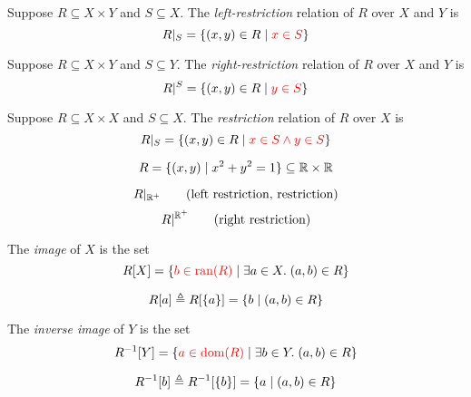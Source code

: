 \begin{frame}{}
  \begin{definition}
    Suppose $R \subseteq X \times Y$ and $S \subseteq X$.
    The {\it left-restriction} relation of $R$  over $X$ and $Y$ is
    \[
      R|_{S} = \{(x, y) \in R \mid \textcolor{red}{x \in S}\}
    \]
  \end{definition}

  \pause
  \vspace{0.50cm}
  \begin{definition}
    Suppose $R \subseteq X \times Y$ and $S \subseteq Y$.
    The {\it right-restriction} relation of $R$  over $X$ and $Y$ is
    \[
      R|^{S} = \{(x, y) \in R \mid \textcolor{red}{y \in S}\}
    \]
  \end{definition}

  \pause
  \vspace{0.50cm}
  \begin{definition}[限制 (Restriction)]
    Suppose $R \subseteq X \times X$ and $S \subseteq X$.
    The {\it restriction} relation of $R$  over $X$ is
    \[
      R|_{S} = \{(x, y) \in R \mid \textcolor{red}{x \in S \land y \in S}\}
    \]
  \end{definition}
\end{frame}

\begin{frame}{}
  \[
    R = \{(x, y) \mid x^2 + y^2 = 1\} \subseteq \mathbb{R} \times \mathbb{R}
  \]

  \pause
  \[
    R|_{\mathbb{R}^{+}} \qquad (\text{left restriction, restriction})
  \]
  \pause
  \[
    R|^{\mathbb{R}^{+}} \qquad (\text{right restriction})
  \]
\end{frame}

\begin{frame}{}
  \begin{definition}[像 (Image)]
    The {\it image} of $X$  is the set
    \[
      R[X] = \{\textcolor{red}{b \in \text{ran}(R)} \mid \exists a \in X.\; (a, b) \in R\}
    \]
  \end{definition}

  \pause
  \[
    R[a] \triangleq R[\{a\}] = \{b \mid (a, b) \in R\}
  \]
\end{frame}

\begin{frame}{}
  \begin{definition}
    The {\it inverse image} of $Y$  is the set
    \[
      R^{-1}[Y] = \{\textcolor{red}{a \in \text{dom}(R)} \mid \exists b \in Y.\; (a, b) \in R\}
    \]
  \end{definition}

  \pause
  \[
    R^{-1}[b] \triangleq R^{-1}[\{b\}] = \{a \mid (a, b) \in R\}
  \]
\end{frame}

